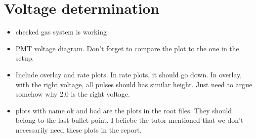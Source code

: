 \section{Voltage determination}

\begin{itemize}
	\item  checked gas system is working

	\item PMT voltage diagram. Don't forget to compare the plot to the one in the setup.

	\item Include overlay and rate plots. In rate plots, it should go down. In overlay, with the right voltage, all pulses should has similar height. Just need to argue somehow why 2.0 is the right voltage.
	\item plots with name ok and bad are the plots in the root files. They should belong to the last bullet point. I beliebe the tutor mentioned that we don't necessarily need these plots in the report.
\end{itemize}
